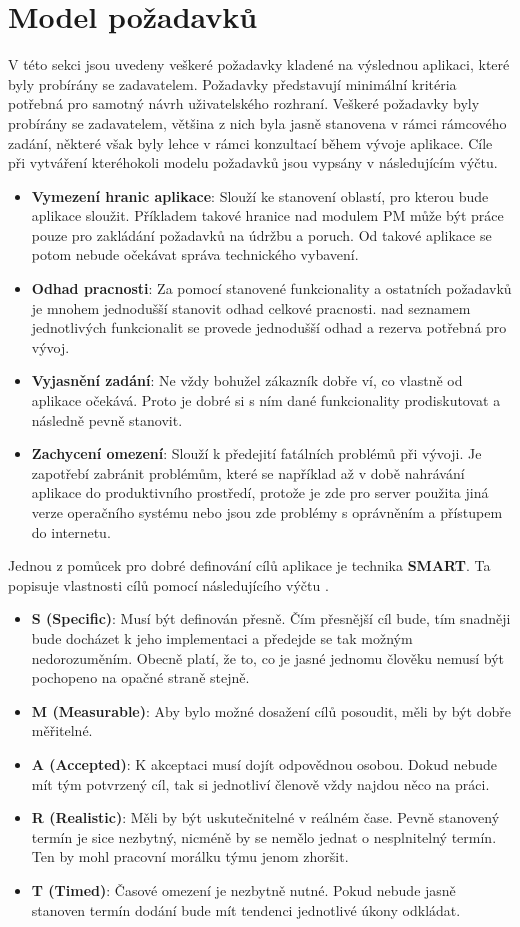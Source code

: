 \documentclass[thesis=M,czech]{FITthesis}[2012/06/26]
\begin{document}
\section{Model požadavků}
\label{sec:model_pozadavku}
V této sekci jsou uvedeny veškeré požadavky kladené na výslednou aplikaci, které byly probírány se zadavatelem. Požadavky představují minimální kritéria potřebná pro samotný návrh uživatelského rozhraní. Veškeré požadavky byly probírány se zadavatelem, většina z nich byla jasně stanovena v rámci rámcového zadání, některé však byly lehce v rámci konzultací během vývoje aplikace. Cíle při vytváření kteréhokoli modelu požadavků jsou vypsány v následujícím výčtu.
\begin{itemize}
	\item
	\textbf{Vymezení hranic aplikace}: Slouží ke stanovení oblastí, pro kterou bude aplikace sloužit. Příkladem takové hranice nad modulem PM může být práce pouze pro zakládání požadavků na údržbu a poruch. Od takové aplikace se potom nebude očekávat správa technického vybavení.
	\item
	\textbf{Odhad pracnosti}: Za pomocí stanovené funkcionality a ostatních požadavků je mnohem jednodušší stanovit odhad celkové pracnosti. nad seznamem jednotlivých funkcionalit se provede jednodušší odhad a rezerva potřebná pro vývoj.
	\item
	\textbf{Vyjasnění zadání}: Ne vždy bohužel zákazník dobře ví, co vlastně od aplikace očekává. Proto je dobré si s ním dané funkcionality prodiskutovat a následně pevně stanovit.
	\item
	\textbf{Zachycení omezení}: Slouží k předejití fatálních problémů při vývoji. Je zapotřebí zabránit problémům, které se například až v době nahrávání aplikace do produktivního prostředí, protože je zde pro server použita jiná verze operačního systému nebo jsou zde problémy s oprávněním a přístupem do internetu.
\end{itemize} 
Jednou z pomůcek pro dobré definování cílů aplikace je technika \textbf{SMART}. Ta popisuje vlastnosti cílů pomocí následujícího výčtu \cite{edux_pcm1}. 
\begin{itemize}
	\item
	\textbf{S (Specific)}: Musí být definován přesně. Čím přesnější cíl bude, tím snadněji bude docházet k jeho implementaci a předejde se tak možným nedorozuměním. Obecně platí, že to, co je jasné jednomu člověku nemusí být pochopeno na opačné straně stejně. 
	\item
	\textbf{M (Measurable)}: Aby bylo možné dosažení cílů posoudit, měli by být dobře měřitelné.
	\item
	\textbf{A (Accepted)}: K akceptaci musí dojít odpovědnou osobou. Dokud nebude mít tým potvrzený cíl, tak si jednotliví členově vždy najdou něco  na práci.
	\item
	\textbf{R (Realistic)}: Měli by být uskutečnitelné v reálném čase. Pevně stanovený termín je sice nezbytný, nicméně by se nemělo jednat o nesplnitelný termín. Ten by mohl pracovní morálku týmu jenom zhoršit.
	\item
	\textbf{T (Timed)}: Časové omezení je nezbytně nutné. Pokud nebude jasně stanoven termín dodání bude mít tendenci jednotlivé úkony odkládat.
\end{itemize} 
\end{document}
